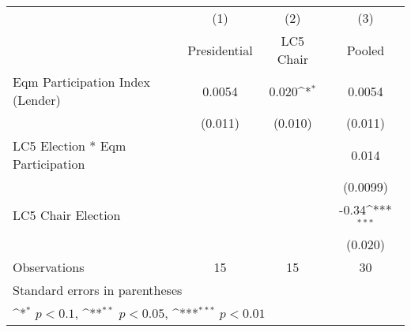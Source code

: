 {
\def\sym#1{\ifmmode^{#1}\else\(^{#1}\)\fi}
\begin{tabular}{l*{3}{c}}
\toprule
                &\multicolumn{1}{c}{(1)}&\multicolumn{1}{c}{(2)}&\multicolumn{1}{c}{(3)}\\
                &\multicolumn{1}{c}{Presidential}&\multicolumn{1}{c}{LC5 Chair}&\multicolumn{1}{c}{Pooled}\\
\midrule
Eqm Participation Index (Lender)&   0.0054         &    0.020\sym{*}  &   0.0054         \\
                &  (0.011)         &  (0.010)         &  (0.011)         \\
LC5 Election * Eqm Participation&                  &                  &    0.014         \\
                &                  &                  & (0.0099)         \\
LC5 Chair Election&                  &                  &    -0.34\sym{***}\\
                &                  &                  &  (0.020)         \\
\midrule
Observations    &       15         &       15         &       30         \\
\bottomrule
\multicolumn{4}{l}{\footnotesize Standard errors in parentheses}\\
\multicolumn{4}{l}{\footnotesize \sym{*} \(p<0.1\), \sym{**} \(p<0.05\), \sym{***} \(p<0.01\)}\\
\end{tabular}
}
